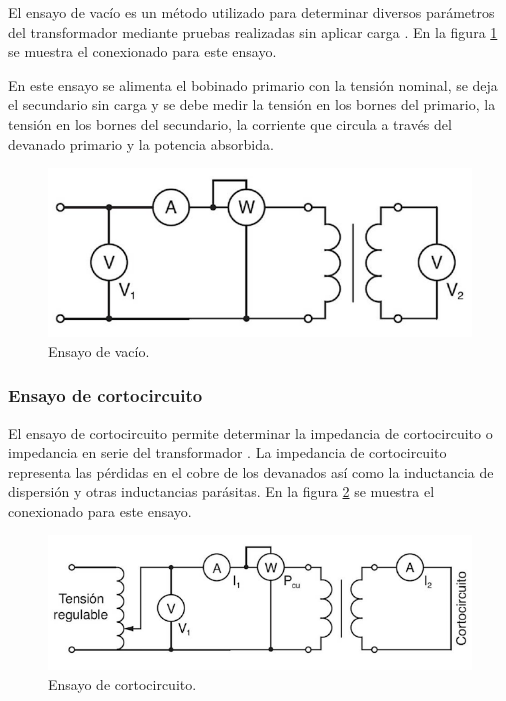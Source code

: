 El ensayo de vacío es un método utilizado para determinar diversos parámetros del transformador mediante pruebas realizadas sin aplicar carga \citep{TRAFO_VACIO}. En la figura \ref{fig:figEnsayoVacio} se muestra el conexionado para este ensayo.

En este ensayo se alimenta el bobinado primario con la tensión nominal, se deja el secundario sin carga y se debe medir la tensión en los bornes del primario, la tensión en los bornes del secundario, la corriente que circula a través del devanado primario y la potencia absorbida. 

\begin{figure}[htpb]
	\centering
	\includegraphics[scale=.4]{./Figures/EnsayoVacio.png}
	\caption{Ensayo de vacío.}
	\label{fig:figEnsayoVacio}
\end{figure}

\subsubsection{Ensayo de cortocircuito}
El ensayo de cortocircuito permite determinar la impedancia de cortocircuito o impedancia en serie del transformador \citep{TRAFO_CORTO}. La impedancia de cortocircuito representa las pérdidas en el cobre de los devanados así como la inductancia de dispersión y otras inductancias parásitas. En la figura \ref{fig:figEnsayoCorto} se muestra el conexionado para este ensayo.

\begin{figure}[htpb]
	\centering
	\includegraphics[scale=.5]{./Figures/EnsayoCorto.png}
	\caption{Ensayo de cortocircuito.}
	\label{fig:figEnsayoCorto}
\end{figure}

